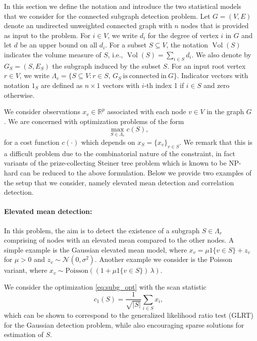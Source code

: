 \documentclass{article}
\DeclareMathOperator{\Vol}{Vol}
\begin{document}
In this section we define the notation and introduce the two statistical models that we consider for the connected subgraph detection problem. Let $G = (V,E)$ denote an undirected unweighted connected graph with $n$ nodes that is provided as input to the problem. For $i \in V$, we write $d_i$ for the degree of vertex $i$ in $G$ and let $d$ be an upper bound on all $d_i$. For a subset $S \subseteq V$, the notation $\Vol(S)$ indicates the volume measure of $S$, i.e., $
\Vol(S) = \sum_{i \in S} d_i$.
We also denote by $G_S = (S, E_S)$ the subgraph induced by the subset $S$. For an input root vertex $r \in V$, we write $\Lambda_r = \{S \subseteq V : r \in S, \, G_S~\mathrm{is~connected~in}~G \}$. Indicator vectors with notation $1_S$ are defined as $n \times 1$ vectors with $i$-th index 1 if $i \in S$ and zero otherwise.


We consider observations $x_v \in \mathbb{R}^p$ associated with each node $v \in V$ in the graph $G$. We are concerned with optimization problems of the form
\begin{equation}
  \max_{S \in \Lambda_r} c(S),
  \label{eq:subg_opt}
\end{equation}
for a cost function $c(\cdot)$ which depends on $x_S = \{x_v\}_{v \in S}$. We remark that this is a difficult problem due to the combinatorial nature of the constraint, in fact variants of the prize-collecting Steiner tree problem which is known to be NP-hard \cite{pcst} can be reduced to the above formulation.
Below we provide two examples of the setup that we consider, namely elevated mean detection and correlation detection.

\paragraph{Elevated mean detection:}
In this problem, the aim is to detect the existence of a subgraph $S \in \Lambda_r$ comprising of nodes with an elevated mean compared to the other nodes. A simple example is the Gaussian elevated mean model, where $x_v = \mu 1\{v \in S\} + z_v$ for $\mu > 0$ and $z_v \sim \mathcal{N}(0, \sigma^2)$. Another example we consider is the Poisson variant, where $x_v \sim \mathrm{Poisson}((1 + \mu 1\{v \in S\}) \, \lambda)$.

We consider the optimization \eqref{eq:subg_opt} with the scan statistic
\begin{equation}
  c_1(S) = \frac{1}{\sqrt{|S|}} \sum_{i \in S} x_i,
  \label{eq:elevated}
\end{equation}
which can be shown to correspond to the generalized likelihood ratio test (GLRT) for the Gaussian detection problem, while also encouraging sparse solutions for estimation of $S$.
\end{document}
